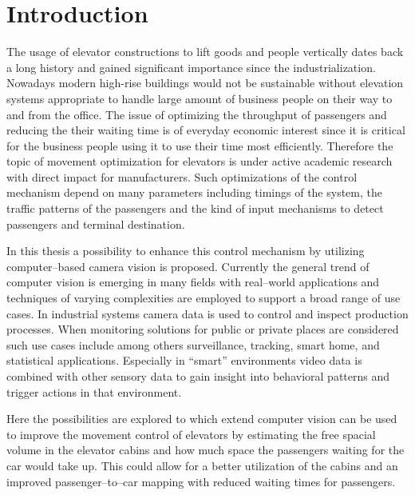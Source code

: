 \chapter{Introduction}
\label{chap:intro}


The usage of elevator constructions to lift goods and people vertically dates back a long history and gained significant importance since the industrialization.
Nowadays modern high-rise buildings would not be sustainable without elevation systems appropriate to handle large amount of business people on their way to and from the office. 
The issue of optimizing the throughput of passengers and reducing the their waiting time is of everyday economic interest since it is critical for the business people using it to use their time most efficiently. 
Therefore the topic of movement optimization for elevators is under active academic research with direct impact for manufacturers.
Such optimizations of the control mechanism depend on many parameters including timings of the system, the traffic patterns of the passengers and the kind of input mechanisms to detect passengers and terminal destination.

In this thesis a possibility to enhance this control mechanism by utilizing computer--based camera vision is proposed.
Currently the general trend of computer vision is emerging in many fields with real--world applications
and techniques of varying complexities are employed to support a broad range of use cases. 
In industrial systems camera data is used to control and inspect production processes. 
When monitoring solutions for public or private places are considered such use cases include among others surveillance, tracking,
smart home, and statistical applications.
Especially in \enquote{smart} environments video data is combined with other sensory data to gain insight into behavioral patterns and trigger actions in that environment.

Here the possibilities are explored to which extend
computer vision can be used to improve the movement control of elevators by estimating the free spacial volume in the elevator cabins and how much space the passengers waiting for the car would take up.
This could allow for a better utilization of the cabins and an improved passenger--to--car mapping with reduced waiting times for passengers.

